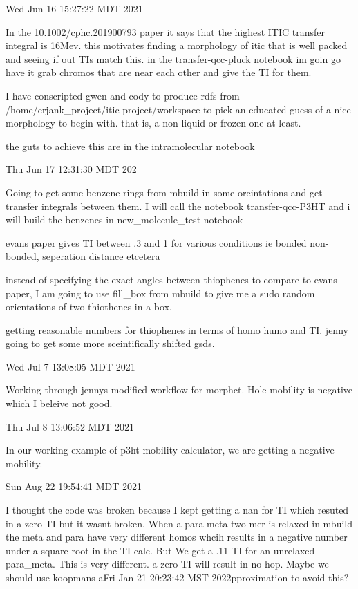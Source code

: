 
Wed Jun 16 15:27:22 MDT 2021
    
       In the 10.1002/cphc.201900793 paper it says that the highest ITIC transfer integral 
       is 16Mev. this motivates finding a morphology of itic that is well packed and 
       seeing if out TIs match this. in the transfer-qcc-pluck notebook im goin go 
       have it grab chromos that are near each other and give the TI for them.
    
        I have conscripted gwen and cody to produce rdfs from /home/erjank_project/itic-project/workspace 
        to pick an educated guess of a nice morphology to begin with. that is, a non liquid or frozen one
        at least.

        the guts to achieve this are in the intramolecular notebook

Thu Jun 17 12:31:30 MDT 202

      Going to get some benzene rings from mbuild in some oreintations and get transfer integrals 
      between them. I will call the notebook transfer-qcc-P3HT and i will build the benzenes in 
      new_molecule_test notebook

      evans paper gives TI between .3 and 1 for various conditions ie bonded non-bonded, seperation
      distance etcetera

      instead of specifying the exact angles between thiophenes to compare to evans paper,
      I am going to use fill_box from mbuild to give me a sudo random orientations of two
      thiothenes in a box.

      getting reasonable numbers for thiophenes in terms of homo humo and TI. jenny going to get
      some more sceintifically shifted gsds.
      

Wed Jul  7 13:08:05 MDT 2021

      Working through jennys modified workflow for morphct. Hole mobility is negative which I beleive
      not good.

Thu Jul  8 13:06:52 MDT 2021
        
     In our working example of p3ht mobility calculator, we are getting a negative mobility. 

Sun Aug 22 19:54:41 MDT 2021
    
    I thought the code was broken because I kept getting a nan for TI which resuted in a zero TI
    but it wasnt broken. When a para meta two mer is relaxed in mbuild the meta and para have very different
    homos whcih results in a negative number under a square root in the TI calc. But We get a .11 TI for an
    unrelaxed para_meta. This is very different. a zero TI will result in no hop. Maybe we should use koopmans
    aFri Jan 21 20:23:42 MST 2022pproximation to avoid this?

